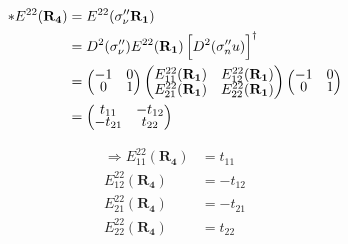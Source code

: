 \documentclass{report}
\begin{document}
\begin{align*}
	\ast E^{22}(\mathbf{R_4}) & = E^{22}(\sigma''_\nu\mathbf{ R_1})                                               \\
	                          & = D^2(\sigma''_\nu)  E^{22}(\mathbf{R_1}) \left[ D^2(\sigma''_nu) \right]^\dagger \\
	                          &
	=
	\begin{pmatrix}
		\renewcommand{\arraystretch}{0.72}
		-1 & 0 \\
		0  & 1
	\end{pmatrix}
	\begin{pmatrix}
		E_{11}^{22}(\mathbf{R_1}) & E_{12}^{22}(\mathbf{R_1}) \\
		E_{21}^{22}(\mathbf{R_1}) & E_{22}^{22}(\mathbf{R_1})
	\end{pmatrix}
	\begin{pmatrix}
		-1 & 0 \\
		0  & 1
	\end{pmatrix}                                                                                                \\
	                          & = \begin{pmatrix}
		                              t_{11}  & -t_{12} \\
		                              -t_{21} & t_{22}
	                              \end{pmatrix}
\end{align*}

\begin{align*}
	\Rightarrow E_{11}^{22}(\mathbf{R_4}) & = t_{11}  \\
	E_{12}^{22}(\mathbf{R_4})             & = -t_{12} \\
	E_{21}^{22}(\mathbf{R_4})             & = -t_{21} \\
	E_{22}^{22}(\mathbf{R_4})             & = t_{22}  \\
\end{align*}
\end{document}
